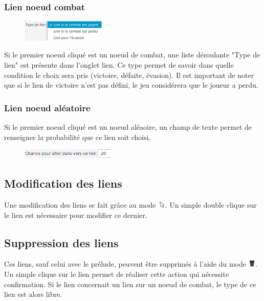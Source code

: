 			\subsubsection{Lien noeud combat}
				\label{subsubsec:lienCombat}

				\begin{figure}
					\centering\includegraphics[width=4cm, keepaspectratio]{img/lienCombat.png}
				\end{figure}
				Si le premier noeud cliqué est un noeud de combat, une liste déroulante "Type de lien" est présente dans l'onglet lien. Ce type permet de savoir dans quelle condition le choix sera pris (victoire, défaite, évasion). Il est important de noter que si le lien de victoire n'est pas défini, le jeu considérera que le joueur a perdu.

			\subsubsection{Lien noeud aléatoire}
				\label{subsubsec:lienAléatoire}

				Si le premier noeud cliqué est un noeud aléaoire, un champ de texte permet de renseigner la probabilité que ce lien soit choisi.

				\begin{figure}[H]
					\centering\includegraphics[width=0.4\textwidth, keepaspectratio]{img/lienAleatoire.png}
				\end{figure}

		\subsection{Modification des liens}

			Une modification des liens se fait grâce au mode \includegraphics[height=10pt, keepaspectratio]{img/icons/select.png}. Un simple double clique sur le lien est nécessaire pour modifier ce dernier.

		\subsection{Suppression des liens}

			Ces liens, sauf celui avec le prélude, peuvent être supprimés à l'aide du mode \includegraphics[height=10pt, keepaspectratio]{img/icons/delete.png}. Un simple clique sur le lien permet de réaliser cette action qui nécessite confirmation. Si le lien concernait un lien sur un noeud de combat, le type de ce lien est alors libre.
